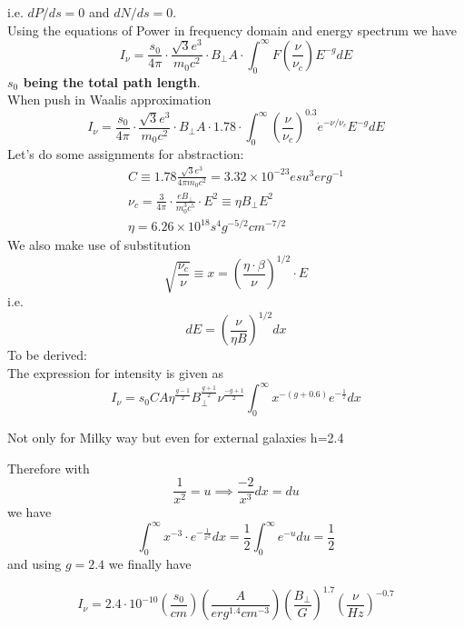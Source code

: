\documentclass[12pt]{report}
\newcommand{\cbox}{tcolorbox}
\newcommand{\cc}[1]{\left({#1}\right)}
\begin{document}
i.e. $dP/ds=0$ and $dN/ds=0$.\\
Using the equations of Power in frequency domain and energy spectrum we have
\begin{equation}
I_\nu=\frac{s_0}{4\pi}\cdot \frac{\sqrt{3}e^3}{m_0c^2}\cdot B_{\perp} A \cdot \int^{\infty}_0 F\cc{\frac{\nu}{\nu_c}}E^{-g}dE
\end{equation}
\textbf{$s_0$ being the total path length}.\\
When push in Waalis approximation
\begin{equation}
I_\nu=\frac{s_0}{4\pi}\cdot \frac{\sqrt{3}e^3}{m_0c^2}\cdot B_{\perp} A \cdot 1.78 \cdot \int^{\infty}_0 \cc{\frac{\nu}{\nu_c}}^{0.3} \dot e^{-\nu/\nu_c}E^{-g}dE
\end{equation}
Let's do some assignments for abstraction:
\begin{eqnarray*}
C\equiv 1.78  \frac{\sqrt{3}e^3}{4 \pi m_0c^2}=3.32 \times 10^{-23}esu^3 erg^{-1}\\
\nu_c=\frac{3}{4\pi}\cdot\frac{eB_{\perp}}{m_0^3c^5}\cdot E^2\equiv \eta B_{\perp} E^2\\
\eta=6.26 \times 10^{18}s^4g^{-5/2}cm^{-7/2}
\end{eqnarray*}
We also make use of substitution
\begin{equation}
\sqrt{\frac{\nu_c}{\nu}}\equiv x =\cc{\frac{\eta \cdot \beta}{\nu}}^{1/2}\cdot E
\end{equation}
i.e.
\begin{equation}
dE=\cc{\frac{\nu}{\eta B}}^{1/2}dx
\end{equation}
To be derived:\\
The expression for intensity is given as
\begin{equation}
I_\nu=s_0 C A \eta^{\frac{g-1}{2}}B_{\perp}^{\frac{g+1}{2}}\nu^{\frac{-g+1}{2}}\int^\infty_0 x^{-(g+0.6)}e^{-\frac{1}{^2}}dx
\end{equation}
\begin{\cbox}
Not only for Milky way but even for external galaxies h=2.4
\end{\cbox}
Therefore with
\begin{equation}
\frac{1}{x^2}=u \implies \frac{-2}{x^3}dx=du
\end{equation}
we have
\begin{equation}
\int^\infty_0x^{-3}\cdot e^{-\frac{1}{x^2}}dx=\frac{1}{2}\int^\infty_0 e^{-u}du=\frac{1}{2}
\end{equation}
and using $g=2.4$ we finally have
\begin{\cbox}
\begin{equation}
I_\nu=2.4 \cdot 10^{-10}\cc{\frac{s_0}{cm}}\cc{\frac{A}{erg^{1.4}cm^{-3}}}\cc{\frac{B_\perp}{G}}^{1.7}\cc{\frac{\nu}{Hz}}^{-0.7}
\end{equation}
\end{\cbox}
\end{document}
